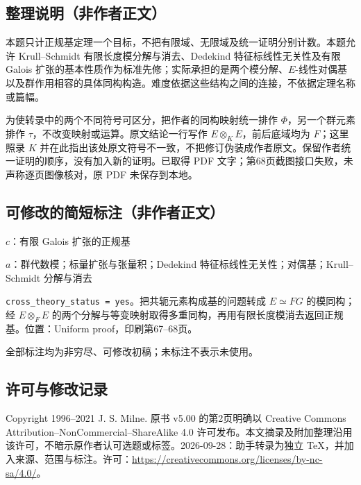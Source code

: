 \documentclass[UTF8,11pt]{ctexart}
\theoremstyle{definition}
\begin{document}
\subsection*{整理说明（非作者正文）}
本题只计正规基定理一个目标，不把有限域、无限域及统一证明分别计数。本题允许 Krull--Schmidt 有限长度模分解与消去、Dedekind 特征标线性无关性及有限 Galois 扩张的基本性质作为标准先修；实际承担的是两个模分解、$E$-线性对偶基以及群作用相容的具体同构构造。难度依据这些结构之间的连接，不依据定理名称或篇幅。

为使转录中的两个不同符号可区分，把作者的同构映射统一排作 $\Phi$，另一个群元素排作 $\tau$，不改变映射或运算。原文结论一行写作 $E\otimes_K E$，前后底域均为 $F$；这里照录 $K$ 并在此指出该处原文符号不一致，不把修订伪装成作者原文。保留作者统一证明的顺序，没有加入新的证明。已取得 PDF 文字；第68页截图接口失败，未声称逐页图像核对，原 PDF 未保存到本地。
\subsection*{可修改的简短标注（非作者正文）}
$c$：有限 Galois 扩张的正规基

$a$：群代数模；标量扩张与张量积；Dedekind 特征标线性无关性；对偶基；Krull--Schmidt 分解与消去

\texttt{cross\_theory\_status = yes}。把共轭元素构成基的问题转成 $E\simeq FG$ 的模同构；经 $E\otimes_F E$ 的两个分解与等变映射取得多重同构，再用有限长度模消去返回正规基。位置：Uniform proof，印刷第67--68页。

全部标注均为非穷尽、可修改初稿；未标注不表示未使用。
\subsection*{许可与修改记录}
Copyright 1996--2021 J. S. Milne. 原书 v5.00 的第2页明确以 Creative Commons Attribution--NonCommercial--ShareAlike 4.0 许可发布。本文摘录及附加整理沿用该许可，不暗示原作者认可选题或标签。2026-09-28：助手转录为独立 TeX，并加入来源、范围与标注。许可：\url{https://creativecommons.org/licenses/by-nc-sa/4.0/}。
\end{document}

